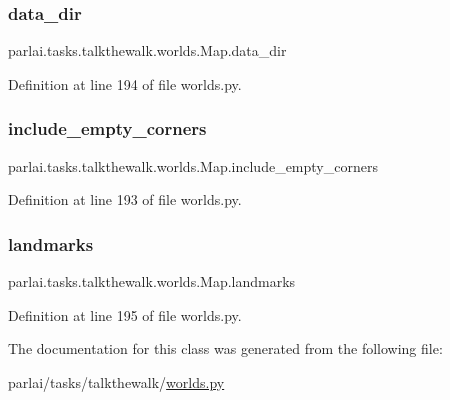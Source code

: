 \subsubsection{\texorpdfstring{data\+\_\+dir}{data\_dir}}
{\footnotesize\ttfamily parlai.\+tasks.\+talkthewalk.\+worlds.\+Map.\+data\+\_\+dir}



Definition at line 194 of file worlds.\+py.

\mbox{\label{classparlai_1_1tasks_1_1talkthewalk_1_1worlds_1_1Map_a8d069664effce0d3bf691ff46e6e76fc}} 
\subsubsection{\texorpdfstring{include\+\_\+empty\+\_\+corners}{include\_empty\_corners}}
{\footnotesize\ttfamily parlai.\+tasks.\+talkthewalk.\+worlds.\+Map.\+include\+\_\+empty\+\_\+corners}



Definition at line 193 of file worlds.\+py.

\mbox{\label{classparlai_1_1tasks_1_1talkthewalk_1_1worlds_1_1Map_a11ed4a0cac5c44b1a61dc702378e5b9f}} 
\subsubsection{\texorpdfstring{landmarks}{landmarks}}
{\footnotesize\ttfamily parlai.\+tasks.\+talkthewalk.\+worlds.\+Map.\+landmarks}



Definition at line 195 of file worlds.\+py.



The documentation for this class was generated from the following file\+:\begin{DoxyCompactItemize}
\item 
parlai/tasks/talkthewalk/\hyperlink{parlai_2tasks_2talkthewalk_2worlds_8py}{worlds.\+py}\end{DoxyCompactItemize}
